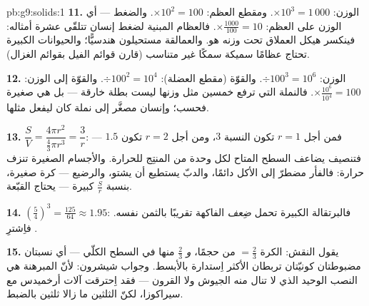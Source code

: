 \begin{solution}{pb:g9:solids:1}
\textbf{11.} الوزن: $\times 10^3 = 1\,000$. ومقطع العظم:
$\times 10^2 = 100$. والضغط --- أي الوزن على  العظم:
$\times \frac{1000}{100} = 10$. فالعظام المبنية لضغط إنسان
تتلقّى عشرة أمثاله: فينكسر هيكل العملاق تحت وزنه هو. والعمالقة
مستحيلون هندسيًّا؛ والحيوانات الكبيرة تحتاج عظامًا سميكة سمكًا
غير متناسب (قارن قوائم الفيل بقوائم الغزال).

\textbf{12.} الوزن: $\div 100^3 = 10^6$. والقوّة (مقطع
العضلة): $\div 100^2 = 10^4$. والقوّة إلى الوزن:
$\times \frac{10^6}{10^4} = 100$. فالنملة التي ترفع خمسين مثل
وزنها ليست بطلة خارقة --- بل هي صغيرة فحسب؛ وإنسان مصغَّر إلى
 نملة كان ليفعل مثلها.

\textbf{13.} $\dfrac{S}{V} = \dfrac{4\pi r^2}{\frac43\pi r^3}
= \dfrac{3}{r}$: فمن أجل $r = 1$ تكون النسبة $3$، ومن أجل
$r = 2$ تكون $1.5$ --- فتنصيف  يضاعف السطح المتاح لكل
وحدة من  المنتِج للحرارة. والأجسام الصغيرة تنزف حرارة:
فالفأر مضطرّ إلى الأكل دائمًا، والدبّ يستطيع أن يشتو، والرضيع
--- كرة صغيرة، بنسبة $\frac Sr$ كبيرة --- يحتاج القبّعة.

\textbf{14.} $\left(\frac54\right)^3 = \frac{125}{64} \approx
1.95$: فالبرتقالة الكبيرة تحمل \emph{ضِعف} الفاكهة تقريبًا
بالثمن نفسه. فاِشترِ .

\textbf{15.} يقول النقش: الكرة $= \frac23$ من
 حجمًا، \emph{و} $\frac23$ منها في السطح الكلّي
--- أي نسبتان مضبوطتان كونيّتان تربطان  الأكثر
اِستدارة بالأبسط. وجواب شيشرون: لأنّ المبرهنة هي النصب الوحيد
الذي لا تنال منه الجيوش ولا القرون --- فقد اِحترقت آلات
أرخميدس مع سيراكوزا، لكنّ الثلثين ما زالا ثلثين بالضبط.
\end{solution}
